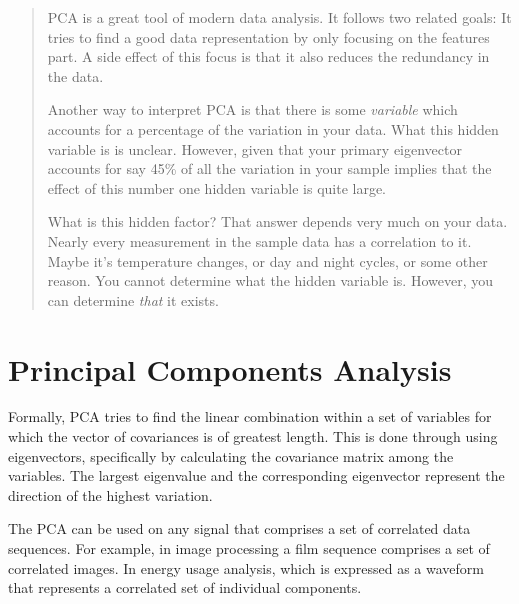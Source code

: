 \documentclass[paper=letter, fontsize=11pt, onecolunm, twoside]{scrartcl}
\begin{document}

\maketitle
\thispagestyle{fancy} %


\begin{abstract}

\ac{PCA} is a great tool of modern data analysis. It follows two
related goals: It tries to find a good data representation by only
focusing on the features part. A side effect of this focus is that it
also reduces the redundancy in the data. 

Another way to interpret PCA is that there is some \emph{variable}
which accounts for a percentage of the variation in your data. What
this hidden variable is is unclear. However, given that your primary
eigenvector accounts for say 45\% of all the variation in your sample
implies that the effect of this number one hidden variable is quite
large. 

What is this hidden factor? That answer depends very much on your
data. Nearly every measurement in the sample data has a correlation to
it.  Maybe it's temperature changes, or day and night cycles, or some
other reason.  You cannot determine what the hidden variable is.
However, you can determine \emph{that} it exists.
\end{abstract}


\section{Principal Components Analysis}
Formally, \ac{PCA} tries to find the linear combination within a set
of variables for which the vector of covariances is of greatest
length. This is done through using eigenvectors, specifically by
calculating the covariance matrix among the variables. The largest
eigenvalue and the corresponding eigenvector represent the direction
of the highest variation.


The \ac{PCA} can be used on any signal that comprises a set of
correlated data sequences. For example, in image processing a film
sequence comprises a set of correlated images. In energy usage
analysis, which is expressed as a waveform that represents a
correlated set of individual components.
\end{document}
